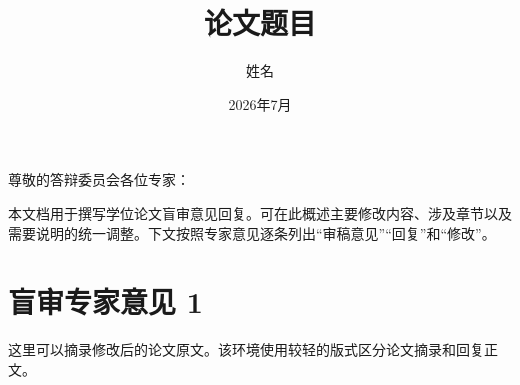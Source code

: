 \documentclass[degree=doctor]{reviewresponse}
\title{论文题目}
\author{姓名}
\date{2026年7月}
\begin{document}
\maketitle

\begin{modificationoverview}
\noindent 尊敬的答辩委员会各位专家：

本文档用于撰写学位论文盲审意见回复。可在此概述主要修改内容、涉及章节以及需要说明的统一调整。下文按照专家意见逐条列出“审稿意见”“回复”和“修改”。
\end{modificationoverview}

\tableofcontents

\section{盲审专家意见 1}




\begin{changes}
这里可以摘录修改后的论文原文。该环境使用较轻的版式区分论文摘录和回复正文。
\end{changes}
\end{document}
